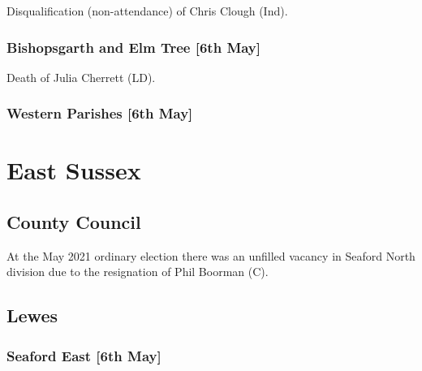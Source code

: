 \documentclass[a4paper,openany]{book}
\begin{document}
\begin{resultsiii}

Disqualification (non-attendance) of Chris Clough (Ind).

\subsubsection*{Bishopsgarth and Elm Tree \hspace*{\fill}\nolinebreak[1]%
	\enspace\hspace*{\fill}
	[6th May]}


Death of Julia Cherrett (LD).

\subsubsection*{Western Parishes \hspace*{\fill}\nolinebreak[1]%
	\enspace\hspace*{\fill}
	[6th May]}



\section{East Sussex}

\subsection*{County Council}

At the May 2021 ordinary election there was an unfilled vacancy in Seaford North division due to the resignation of Phil Boorman (C).

\subsection*{Lewes}

\subsubsection*{Seaford East \hspace*{\fill}\nolinebreak[1]%
	\enspace\hspace*{\fill}
	[6th May]}


\end{resultsiii}
\end{document}

